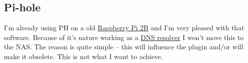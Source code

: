 

\subsection{Pi-hole}\label{subsec:Pi-hole}

I'm already using \gls{PH} on a old \href{https://www.raspberrypi.com/products/raspberry-pi-2-model-b/}{Raspberry Pi 2B}
and I'm very pleased with that software. Because of it's nature working as a
\href{https://en.wikipedia.org/wiki/Domain_Name_System#DNS_resolvers}{DNS resolver}
I won't move this to the NAS. The reason is quite simple -- this will influence
the  plugin and/or will make it obsolete. This is
not what I want to achieve.
